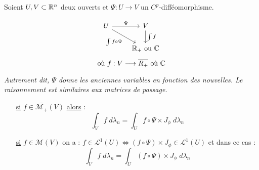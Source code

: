 \begin{theorem}
    Soient $U,V \subset \mathbb{R}^n$ deux ouverts et $\Psi : U \longrightarrow V$ un $C^p$-difféomorphisme. 

    \vspace{0.5cm}
    \begin{minipage}{0.45\textwidth}
        \[
        \begin{tikzcd}[scale=1.25\textwidth]
            U \arrow[r, "\Psi"] \arrow[rd, "\int f \circ \Psi" swap] & V \arrow[d, "\int f"] \\
                                                                   & \mathbb{R}_+ \text{ ou } \mathbb{C}
        \end{tikzcd}
        \]
        \[ \text{où } f : V \longrightarrow \overline{R_+} \text{ où } \mathbb{C} \]
    \end{minipage}
    \hfill
    \begin{minipage}{0.45\textwidth}
        \emph{Autrement dit, $\Psi$ donne les anciennes variables en fonction des nouvelles. 
        Le raisonnement est similaires aux matrices de passage.}
    \end{minipage}
    \vspace{0.5cm}
    \begin{itemize}
        \item[\underline{si}] $f \in \overline{\mathcal{M}_+}(V)$ \underline{alors} :
            \[ \boxed{ \int_V f \; d \lambda_n = \int_U f \circ \Psi \times J_\phi \; d \lambda_n} \] 
        \item[\underline{si}] $f \in {\mathcal{M}}(V)$ on a : $ f \in \mathcal{L}^1(U) \Longleftrightarrow (f \circ \Psi) \times J_\phi \in \mathcal{L}^1(U) $
             et dans ce cas :
                \[ \int_V f \; d \lambda_n = \int_U (f \circ \Psi) \times J_\phi \; d \lambda_n \]
    \end{itemize}
\end{theorem}


